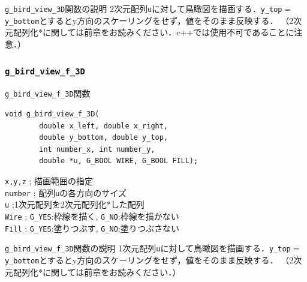 \documentclass[platex,a4paper,12pt]{jsarticle}%
\begin{document}
\begin{itembox}[l]{\texttt{g\_bird\_view\_3D}関数の説明}
2次元配列\verb|u|に対して鳥瞰図を描画する．\verb|y_top|$=$\verb|y_bottom|とするとy方向のスケーリングをせず，値をそのまま反映する．
（2次元配列化*に関しては前章をお読みください．c++では使用不可であることに注意．）
\end{itembox}





\clearpage
\subsubsection{\texttt{g\_bird\_view\_f\_3D}}

\begin{itembox}[l]{\texttt{g\_bird\_view\_f\_3D}関数}
\begin{verbatim}
void g_bird_view_f_3D(
        double x_left, double x_right, 
        double y_bottom, double y_top,
        int number_x, int number_y,
        double *u, G_BOOL WIRE, G_BOOL FILL);
\end{verbatim}
\verb|x,y,z| ; 描画範囲の指定\\
\verb|number| ; 配列\verb|u|の各方向のサイズ\\
\verb|u| ;1次元配列を2次元配列化*した配列\\
\verb|Wire| ; \verb|G_YES|:枠線を描く, \verb|G_NO|:枠線を描かない \\
\verb|Fill| ; \verb|G_YES|:塗りつぶす, \verb|G_NO|:塗りつぶさない 
\end{itembox}

\begin{itembox}[l]{\texttt{g\_bird\_view\_f\_3D}関数の説明}
1次元配列\verb|u|に対して鳥瞰図を描画する．\verb|y_top|$=$\verb|y_bottom|とするとy方向のスケーリングをせず，値をそのまま反映する．
（2次元配列化*に関しては前章をお読みください．）
\end{itembox}
\end{document}
